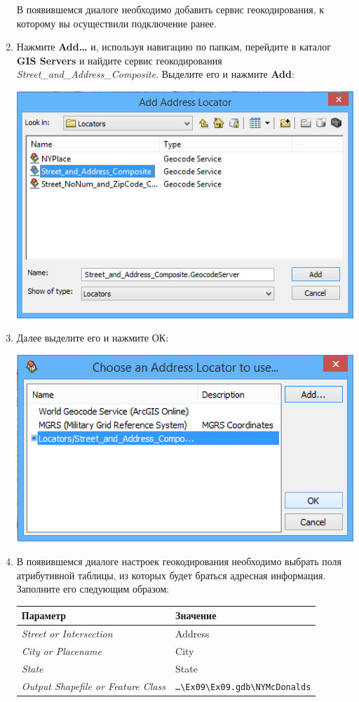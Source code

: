 \documentclass[12pt,]{book}
\begin{document}
\begin{enumerate}
  В появившемся диалоге необходимо добавить сервис геокодирования, к которому вы осуществили подключение ранее.
\item
  Нажмите \textbf{Add\ldots{}} и, используя навигацию по папкам, перейдите в каталог \textbf{GIS Servers} и найдите сервис геокодирования \emph{Street\_and\_Address\_Composite}. Выделите его и нажмите \textbf{Add}:

  \includegraphics{images/Ex09/image11.png}
\item
  Далее выделите его и нажмите ОК:

  \includegraphics{images/Ex09/image12.png}
\item
  В появившемся диалоге настроек геокодирования необходимо выбрать поля атрибутивной таблицы, из которых будет браться адресная информация. Заполните его следующим образом:

  \begin{longtable}[]{@{}ll@{}}
  \toprule
  Параметр & Значение\tabularnewline
  \midrule
  \endhead
  \emph{Street or Intersection} & Address\tabularnewline
  \emph{City or Placename} & City\tabularnewline
  \emph{State} & State\tabularnewline
  \emph{Output Shapefile or Feature Class} & \texttt{\ldots{}\textbackslash{}Ex09\textbackslash{}Ex09.gdb\textbackslash{}NYMcDonalds}\tabularnewline
  \bottomrule
  \end{longtable}


\end{enumerate}
\end{document}
